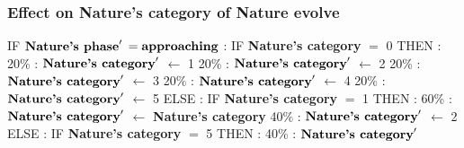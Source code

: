 \documentclass{article}%
\begin{document}
\subsubsection{Effect on Nature's category of Nature evolve}%
\label{ssubsec:Effect on Nature's category of Nature evolve}%
\begin{flushleft}%
IF %
$\mbox{\textbf{Nature's phase}} '$%
\linebreak%
\hspace*{2em}%
$= \mbox{\textbf{approaching}}$%
: %
IF %
\textbf{Nature's category}%
$=$%
0%
\linebreak%
\hspace*{4em}%
THEN %
: %
\linebreak%
\hspace*{6em}%
20\%%
: %
$\mbox{\textbf{Nature's category}} '$%
$\leftarrow$%
1%
\linebreak%
\hspace*{6em}%
20\%%
: %
$\mbox{\textbf{Nature's category}} '$%
$\leftarrow$%
2%
\linebreak%
\hspace*{6em}%
20\%%
: %
$\mbox{\textbf{Nature's category}} '$%
$\leftarrow$%
3%
\linebreak%
\hspace*{6em}%
20\%%
: %
$\mbox{\textbf{Nature's category}} '$%
$\leftarrow$%
4%
\linebreak%
\hspace*{6em}%
20\%%
: %
$\mbox{\textbf{Nature's category}} '$%
$\leftarrow$%
5%
\linebreak%
\hspace*{4em}%
ELSE %
: %
IF %
\textbf{Nature's category}%
$=$%
1%
\linebreak%
\hspace*{6em}%
THEN %
: %
\linebreak%
\hspace*{8em}%
60\%%
: %
$\mbox{\textbf{Nature's category}} '$%
$\leftarrow$%
\textbf{Nature's category}%
\linebreak%
\hspace*{8em}%
40\%%
: %
$\mbox{\textbf{Nature's category}} '$%
$\leftarrow$%
2%
\linebreak%
\hspace*{6em}%
ELSE %
: %
IF %
\textbf{Nature's category}%
$=$%
5%
\linebreak%
\hspace*{8em}%
THEN %
: %
\linebreak%
\hspace*{10em}%
40\%%
: %
$\mbox{\textbf{Nature's category}} '$%

\end{flushleft}
\end{document}
